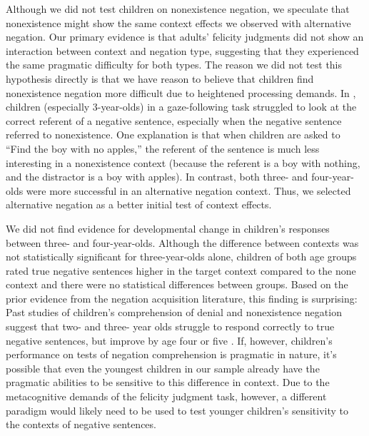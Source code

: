 \documentclass[man, noapacite]{apa2}
\begin{document}
Although we did not test children on nonexistence negation, we speculate that nonexistence might show the same context effects we observed with alternative negation. Our primary evidence is that adults' felicity judgments did not show an interaction between context and negation type, suggesting that they experienced the same pragmatic difficulty for both types. The reason we did not test this hypothesis directly is that we have reason to believe that children find nonexistence negation more difficult due to heightened processing demands. In , children (especially 3-year-olds) in a gaze-following task struggled to look at the correct referent of a negative sentence, especially when the negative sentence referred to nonexistence. One explanation is that when children are asked to ``Find the boy with no apples,'' the referent of the sentence is much less interesting in a nonexistence context (because the referent is a boy with nothing, and the distractor is a boy with apples). In contrast, both three- and four-year-olds were more successful in an alternative negation context. Thus, we selected alternative negation as a better initial test of context effects.

We did not find evidence for developmental change in children's responses between three- and four-year-olds. Although the difference between contexts was not statistically significant for three-year-olds alone, children of both age groups rated true negative sentences higher in the target context compared to the none context and there were no statistical differences between groups. Based on the prior evidence from the negation acquisition literature, this finding is surprising: Past studies of children's comprehension of denial and nonexistence negation suggest that two- and three- year olds struggle to respond correctly to true negative sentences, but improve by age four or five \cite{kim1985, nordmeyer2014b}. If, however, children's performance on tests of negation comprehension is pragmatic in nature, it's possible that even the youngest children in our sample already have the pragmatic abilities to be sensitive to this difference in context. Due to the metacognitive demands of the felicity judgment task, however, a different paradigm would likely need to be used to test younger children's sensitivity to the contexts of negative sentences.
\end{document}
